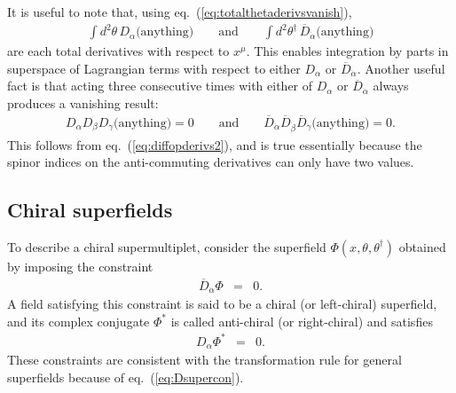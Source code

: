 \documentclass[11pt]{article}
\def\beq{\begin{eqnarray}}
\def\eeq{\end{eqnarray}}
\def\Dcon{\overline D}
\begin{document}
It is useful to note that, using eq.~(\ref{eq:totalthetaderivsvanish}), 
\beq
\int d^2\theta \,D_\alpha \mbox{(anything)} \qquad\mbox{and}\qquad
\int d^2\theta^\dagger \,\Dcon_{\dot\alpha} \mbox{(anything)}
\eeq
are each total derivatives with respect to $x^\mu$. This enables integration by parts 
in superspace
of Lagrangian terms with respect to either $D_\alpha$ or $\Dcon_{\dot\alpha}$. Another useful fact is that
acting three consecutive times with either of $D_\alpha$ or $\Dcon_{\dot\alpha}$ always produces a vanishing result:
\beq
D_\alpha D_\beta D_\gamma \mbox{(anything)} = 0 \qquad\mbox{and}\qquad
\Dcon_{\dot\alpha} \Dcon_{\dot\beta} \Dcon_{\dot\gamma} \mbox{(anything)} = 0.
\label{eq:DDDeq0}
\eeq
This follows from eq.~(\ref{eq:diffopderivs2}), and is true essentially 
because the spinor indices on the anti-commuting derivatives can only have two values.

\subsection{Chiral superfields\label{chiralsuperfields}}
\setcounter{equation}{0}
\setcounter{footnote}{2}

To describe a chiral supermultiplet, 
consider the superfield $\Phi(x,\theta,\theta^\dagger)$ 
obtained by imposing the constraint
\beq
\Dcon_{\dot \alpha} \Phi &=& 0.
\label{eq:leftchiralsuperfieldconstraint}
\eeq
A field satisfying this constraint is said to be a chiral (or 
left-chiral) superfield, and its complex conjugate $\Phi^*$ is called 
anti-chiral (or right-chiral) and satisfies
\beq
D_{\alpha} \Phi^* &=& 0.
\label{eq:anti-chiralsuperfieldconstraint}
\eeq
These constraints are 
consistent with the transformation rule for general superfields 
because of eq.~(\ref{eq:Dsupercon}).
\end{document}
